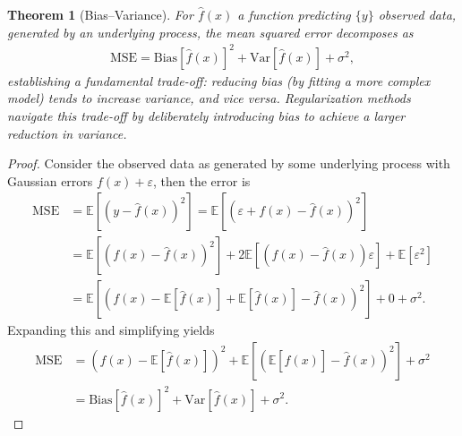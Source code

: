\documentclass[11pt]{article}
\theoremstyle{definition}
\theoremstyle{plain}
\newtheorem{theorem}{Theorem}[section]
\theoremstyle{remark}
\begin{document}
\begin{theorem}[Bias--Variance]
    For $\hat{f}(x)$ a function predicting $\{y\}$ observed data, generated by an underlying process, the mean squared error decomposes as
    \begin{align}
        \text{MSE} = \text{Bias}[\hat{f}(x)]^2 + \text{Var}[\hat{f}(x)] + \sigma^2,
    \end{align}
    establishing a fundamental trade-off: reducing bias (by fitting a more complex model) tends to increase variance, and vice versa. Regularization methods navigate this trade-off by deliberately introducing bias to achieve a larger reduction in variance.
\end{theorem}
\begin{proof}
    Consider the observed data as generated by some underlying process with Gaussian errors $f(x)+\varepsilon$, then the error is
    \begin{align}
        \text{MSE} &= \mathbb{E}[(y-\hat{f}(x))^2] = \mathbb{E}[(\varepsilon +f(x)-\hat{f}(x))^2] \\
        &= \mathbb{E}[(f(x)-\hat{f}(x))^2] + 2\mathbb{E}[(f(x)-\hat{f}(x))\varepsilon] + \mathbb{E}[\varepsilon^2]\\
        &=\mathbb{E}[(f(x) - \mathbb{E}[\hat{f}(x)]+\mathbb{E}[\hat{f}(x)]-\hat{f}(x))^2] + 0 + \sigma^2.
    \end{align}
    Expanding this and simplifying yields
    \begin{align}
        \text{MSE} &= (f(x)-\mathbb{E}[\hat{f}(x)])^2 + \mathbb{E}[(\mathbb{E}[\hat{f}(x)]-\hat{f}(x))^2]+\sigma^2\\
        &= \text{Bias}[\hat{f}(x)]^2 + \text{Var}[\hat{f}(x)] + \sigma^2.
    \end{align}
\end{proof}
\end{document}
